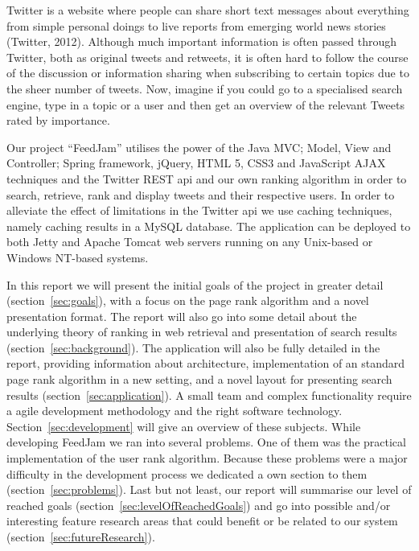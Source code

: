 Twitter is a website where people can share short text messages about everything from simple personal doings to live reports from emerging world news stories (Twitter, 2012). Although much important information is often passed through Twitter, both as original tweets and retweets, it is often hard to follow the course of the discussion or information sharing when subscribing to certain topics due to the sheer number of tweets. Now, imagine if you could go to a specialised search engine, type in a topic or a user and then get an overview of the relevant Tweets rated by importance.

Our project “FeedJam” utilises the power of the Java MVC; Model, View and Controller; Spring framework, jQuery, HTML 5, CSS3 and JavaScript AJAX techniques and the Twitter REST api and our own ranking algorithm in order to search, retrieve, rank and display tweets and their respective users. In order to alleviate the effect of limitations in the Twitter api we use caching techniques, namely caching results in a MySQL database. The application can be deployed to both Jetty and Apache Tomcat web servers running on any Unix-based or Windows NT-based systems.

In this report we will present the initial goals of the project in greater detail (section~\ref{sec:goals}), with a focus on the page rank algorithm and a novel presentation format. The report will also go into some detail about the underlying theory of ranking in web retrieval and presentation of search results (section~\ref{sec:background}). The application will also be fully detailed in the report, providing information about architecture, implementation of an standard page rank algorithm in a new setting, and a novel layout for presenting search results (section~\ref{sec:application}). A small team and complex functionality require a agile development methodology and the right software technology. Section~\ref{sec:development} will give an overview of these subjects. While developing FeedJam we ran into several problems. One of them was the practical implementation of the user rank algorithm. Because these problems were a major difficulty in the development process we dedicated a own section to them (section~\ref{sec:problems}). Last but not least, our report will summarise our level of reached goals (section~\ref{sec:levelOfReachedGoals}) and go into possible and/or interesting feature research areas that could benefit or be related to our system (section~\ref{sec:futureResearch}).